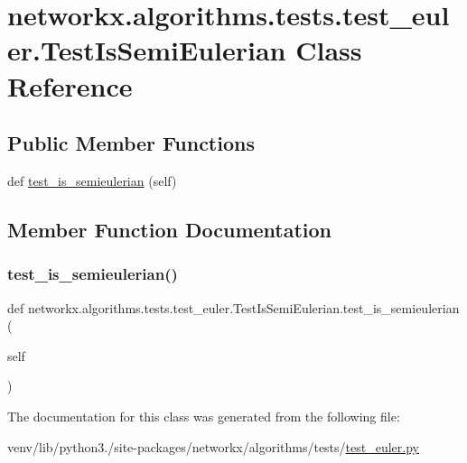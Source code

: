 \hypertarget{classnetworkx_1_1algorithms_1_1tests_1_1test__euler_1_1TestIsSemiEulerian}{}\section{networkx.\+algorithms.\+tests.\+test\+\_\+euler.\+Test\+Is\+Semi\+Eulerian Class Reference}
\label{classnetworkx_1_1algorithms_1_1tests_1_1test__euler_1_1TestIsSemiEulerian}
\subsection*{Public Member Functions}
\begin{DoxyCompactItemize}
\item 
def \hyperlink{classnetworkx_1_1algorithms_1_1tests_1_1test__euler_1_1TestIsSemiEulerian_a7941e7e5ccc70663a5614a0ad3e2647a}{test\+\_\+is\+\_\+semieulerian} (self)
\end{DoxyCompactItemize}


\subsection{Member Function Documentation}
\mbox{\label{classnetworkx_1_1algorithms_1_1tests_1_1test__euler_1_1TestIsSemiEulerian_a7941e7e5ccc70663a5614a0ad3e2647a}} 
\subsubsection{\texorpdfstring{test\+\_\+is\+\_\+semieulerian()}{test\_is\_semieulerian()}}
{\footnotesize\ttfamily def networkx.\+algorithms.\+tests.\+test\+\_\+euler.\+Test\+Is\+Semi\+Eulerian.\+test\+\_\+is\+\_\+semieulerian (\begin{DoxyParamCaption}\item[{}]{self }\end{DoxyParamCaption})}



The documentation for this class was generated from the following file\+:\begin{DoxyCompactItemize}
\item 
venv/lib/python3./site-\/packages/networkx/algorithms/tests/\hyperlink{test__euler_8py}{test\+\_\+euler.\+py}\end{DoxyCompactItemize}
